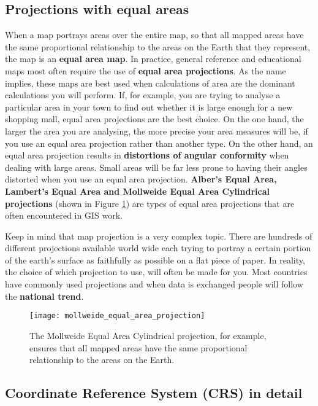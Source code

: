 \subsection{Projections with equal areas}

When a map portrays areas over the entire map, so that all mapped areas have
the same proportional relationship to the areas on the Earth that they
represent, the map is an \textbf{equal area map}. In practice, general reference and
educational maps most often require the use of \textbf{equal area
projections}. As the
name implies, these maps are best used when calculations of area are the
dominant calculations you will perform. If, for example, you are trying to
analyse a particular area in your town to find out whether it is large enough
for a new shopping mall, equal area projections are the best choice. On the
one hand, the larger the area you are analysing, the more precise your area
measures will be, if you use an equal area projection rather than another
type. On the other hand, an equal area projection results in
\textbf{distortions of angular conformity} when dealing with large areas.
Small areas will be far
less prone to having their angles distorted when you use an equal area
projection. \textbf{Alber's Equal Area, Lambert's Equal Area and Mollweide
Equal Area Cylindrical projections} (shown in Figure \ref{fig:mollweide}) are
types of equal area projections that are often encountered in GIS work.

Keep in mind that map projection is a very complex topic. There are hundreds
of different projections available world wide each trying to portray a
certain portion of the earth's surface as faithfully as possible on a flat
piece of paper. In reality, the choice of which projection to use, will often
be made for you. Most countries have commonly used projections and when data
is exchanged people will follow the \textbf{national trend}.

\begin{figure}[ht]
   \begin{center}
   \caption{The Mollweide Equal Area Cylindrical projection, for example,
ensures that all mapped areas have the same proportional relationship to the
areas on the Earth.}
\label{fig:mollweide}\smallskip
   \texttt{[image: mollweide\_equal\_area\_projection]}
\end{center}
\end{figure}

\subsection{Coordinate Reference System (CRS) in detail}

